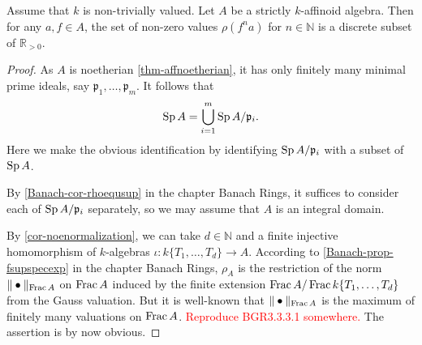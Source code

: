 \begin{lemma}\label{prop-rhodiscrete}
    Assume that $k$ is non-trivially valued.
    Let $A$ be a strictly $k$-affinoid algebra. Then for any $a,f\in A$, the set of non-zero values $\rho(f^n a)$ for $n\in \mathbb{N}$ is a discrete subset of $\mathbb{R}_{>0}$.
\end{lemma}
\begin{proof}
    As $A$ is noetherian \cref{thm-affnoetherian}, it has only finitely many minimal prime ideals, say $\mathfrak{p}_1,\ldots,\mathfrak{p}_m$. It follows that 
    \[
        \operatorname{Sp} A=\bigcup_{i=1}^m \operatorname{Sp} A/\mathfrak{p}_i.
    \]
    Here we make the obvious identification by identifying $\operatorname{Sp} A/\mathfrak{p}_i$ with a subset of $\operatorname{Sp} A$.

    By \cref{Banach-cor-rhoequsup} in the chapter Banach Rings, it suffices to consider each of $\operatorname{Sp} A/\mathfrak{p}_i$ separately, so we may assume that $A$ is an integral domain. 
    
    By \cref{cor-noenormalization}, we can take $d\in \mathbb{N}$ and a finite injective homomorphism of $k$-algebras $\iota:k\{T_1,\ldots,T_d\}\rightarrow A$. According to \cref{Banach-prop-fsupspecexp} in the chapter Banach Rings, $\rho_A$ is the restriction of the norm $\|\bullet\|_{\operatorname{Frac} A}$ on $\operatorname{Frac} A$ induced by the finite extension $\operatorname{Frac} A/\operatorname{Frac} k\{T_1,\ldots,T_d\}$ from the Gauss valuation. But it is well-known that $\|\bullet\|_{\operatorname{Frac} A}$ is the maximum of finitely many valuations on $\operatorname{Frac} A$. \textcolor{red}{Reproduce BGR3.3.3.1 somewhere.} The assertion is by now obvious.
\end{proof}

